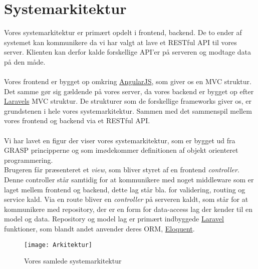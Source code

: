 \section{Systemarkitektur}
Vores systemarkitektur er primært opdelt i frontend, backend.
De to ender af systemet kan kommunikere da vi har valgt at lave et RESTful API til vores server.
Klienten kan derfor kalde forskellige API'er på serveren og modtage data på den måde.
\\\\
Vores frontend er bygget op omkring \hyperlink{AngularJS}{AngularJS}, som giver os en MVC struktur.
Det samme gør sig gældende på vores server, da vores backend er bygget op efter \hyperlink{Laravel}{Laravels} MVC struktur.
De strukturer som de forskellige frameworks giver os, er grundstenen i hele vores systemarkitektur. Sammen med det sammenspil mellem vores frontend og backend via et RESTful API.\@
\\\\
Vi har lavet en figur der viser vores systemarkitektur, som er bygget ud fra GRASP principperne og som imødekommer definitionen af objekt orienteret programmering.\\
Brugeren får præsenteret et \textit{view}, som bliver styret af en frontend \textit{controller}. Denne controller står samtidig for at kommunikere med noget middleware som er laget mellem frontend og backend, dette lag står bla. for validering, routing og service kald. Via en route bliver en \textit{controller} på serveren kaldt, som står for at kommunikere med repository, der er en form for data-access lag der kender til en model og data. Repository og model lag er primært indbyggede \hyperlink{Laravel}{Laravel} funktioner, som blandt andet anvender deres ORM, \href{http://laravel.com/docs/5.1/eloquent}{Eloquent}.
\begin{figure}[here]
\texttt{[image: Arkitektur]}
\caption{Vores samlede systemarkitektur}
\label{fig:arkitektur}
\end{figure}
